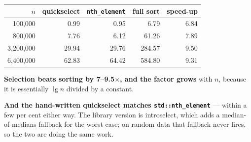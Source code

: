\begin{worked}
\begin{center}
\begin{tabular}{@{}rrrrr@{}}
\toprule
\rowcolor{primary!15}
$n$ & quickselect & \texttt{nth\_element} & full sort & speed-up \\
\midrule
  100{,}000 &  0.99 &  0.95 &   6.79 & 6.84 \\
  800{,}000 &  7.76 &  6.12 &  61.26 & 7.89 \\
3{,}200{,}000 & 29.94 & 29.76 & 284.57 & 9.50 \\
6{,}400{,}000 & 62.83 & 64.42 & 584.80 & 9.31 \\
\bottomrule
\end{tabular}
\end{center}

\smallskip
\textbf{Selection beats sorting by 7--9.5$\times$, and the factor grows} with
$n$, because it is essentially $\lg n$ divided by a constant.

\smallskip
\textbf{And the hand-written quickselect matches \texttt{std::nth\_element}}
--- within a few per cent either way. The library version is introselect, which
adds a median-of-medians fallback for the worst case; on random data that
fallback never fires, so the two are doing the same work.
\end{worked}

